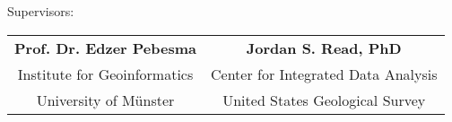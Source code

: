 \begin{spacing}{1}
\begin{center}
\begin{large}
\begin{bold}
      \end{bold}
      \vspace*{\fill}
      \begin{bold}
        Supervisors:\par
      \end{bold}
      \begin{tabular}{cc}
        \textbf{Prof. Dr. Edzer Pebesma}     & \textbf{Jordan S. Read, PhD} \\
        Institute for Geoinformatics         & Center for Integrated Data Analysis\\
        University of Münster                & United States Geological Survey\\
      \end{tabular}
    \end{large}
  \end{center}
\end{spacing}